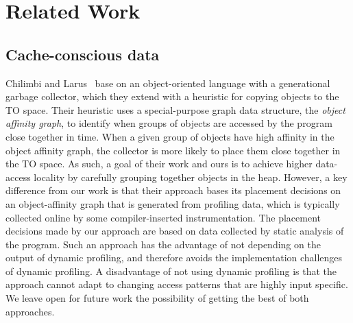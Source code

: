 \section{Related Work}

\subsection{Cache-conscious data}

%
Chilimbi and Larus~\cite{ccgarbage} base on an object-oriented language with a
generational garbage collector, which they extend with a heuristic for
copying objects to the TO space.
%
Their heuristic uses a special-purpose graph data structure, the \emph{object affinity
graph}, to identify when groups of objects are accessed by the program
close together in time.
%
When a given group of objects have high affinity in the object
affinity graph, the collector is more likely to place them close
together in the TO space.
%
As such, a goal of their work and ours is to achieve higher data-access locality
by carefully grouping together objects in the heap.
%
However, a key difference from our work is that their approach bases its placement decisions
on an object-affinity graph that is generated from profiling data, which is
typically collected online by some compiler-inserted instrumentation.
%
The placement decisions made by our approach are based on data collected by static analysis of the program.
%
Such an approach has the advantage of not depending on the output of dynamic profiling, and therefore
avoids the implementation challenges of dynamic profiling.
%
A disadvantage of not using dynamic profiling is that the approach
cannot adapt to changing access patterns that are highly input
specific.
%
We leave open for future work the possibility of getting the best of both approaches.



